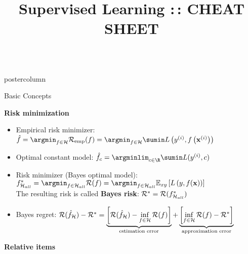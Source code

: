 \documentclass{beamer}
\title{Supervised Learning :\,: CHEAT SHEET} %
\newlength{\columnheight} %
\begin{document}
\begin{frame}[fragile]{}
\begin{columns}
	\begin{column}{.31\textwidth}
		\begin{beamercolorbox}[center]{postercolumn}
			\begin{minipage}{.98\textwidth}
				\parbox[t][\columnheight]{\textwidth}{

        \begin{myblock}{Basic Concepts}

          \begin{codebox}
            \textbf{Risk minimization}
          \end{codebox}
          \begin{itemize}[$\bullet$]
            \setlength{\itemindent}{+.3in}
            \item Empirical risk minimizer: $\hat f = \argmin_{f \in \Hspace} \riskef = \argmin_{f \in \Hspace} \sumin \Lxyi$
            \item Optimal constant model: $\hat{f}_c = \argminlim_{c \in \R} \sumin L(\yi,c)$
            \item Risk minimizer (Bayes optimal model): $\fbayes_{\Hspace_{all}} = \argmin_{f \in \Hspace_{all}} \risk(f) = \argmin_{f \in \Hspace_{all}}\Exy\left[\Lxy\right]$\\
                  The resulting risk is called \textbf{Bayes risk}:  $\mathcal{R}^\ast = \mathcal{R}(f^{\ast}_{\mathcal{H}_{all}})$
            \item Bayes regret:
          $
	        \mathcal{R}(\hat f_{\mathcal{H}}) - \mathcal{R}^\ast = \underbrace{\left[\mathcal{R}(\hat f_{\mathcal{H}}) - \inf_{f \in \mathcal{H}} \mathcal{R}(f)\right]}_{\text{estimation error}} + \underbrace{\left[\inf_{f \in \mathcal{H}} \mathcal{R}(f) - \mathcal{R}^\ast\right]}_{\text{approximation error}}  
          $
          \end{itemize}

          \begin{codebox}
            \textbf{Relative items}
          \end{codebox}
          

\end{myblock}}
\end{minipage}
\end{beamercolorbox}
\end{column}
\end{columns}
\end{frame}
\end{document}
